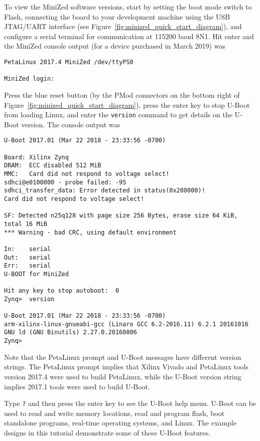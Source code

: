 To view the MiniZed software versions, start by setting the boot mode switch
to Flash, connecting the board to your development machine using the USB
JTAG/UART interface (see Figure~\ref{fig:minized_quick_start_diagram}), and
configure a serial terminal for communication at 115200 baud 8N1.
Hit enter and the MiniZed console output (for a device purchased in March 2019) was
%
\begin{verbatim}
PetaLinux 2017.4 MiniZed /dev/ttyPS0

MiniZed login:
\end{verbatim}
%
Press the blue reset button (by the PMod connectors on the bottom right
of Figure~\ref{fig:minized_quick_start_diagram}), press the enter key to
stop U-Boot from loading Linux, and enter the \verb+version+ command to
get details on the U-Boot version. The console output was
%
\begin{verbatim}
U-Boot 2017.01 (Mar 22 2018 - 23:33:56 -0700)

Board: Xilinx Zynq
DRAM:  ECC disabled 512 MiB
MMC:   Card did not respond to voltage select!
sdhci@e0100000 - probe failed: -95
sdhci_transfer_data: Error detected in status(0x208000)!
Card did not respond to voltage select!

SF: Detected n25q128 with page size 256 Bytes, erase size 64 KiB, total 16 MiB
*** Warning - bad CRC, using default environment

In:    serial
Out:   serial
Err:   serial
U-BOOT for MiniZed

Hit any key to stop autoboot:  0
Zynq>  version

U-Boot 2017.01 (Mar 22 2018 - 23:33:56 -0700)
arm-xilinx-linux-gnueabi-gcc (Linaro GCC 6.2-2016.11) 6.2.1 20161016
GNU ld (GNU Binutils) 2.27.0.20160806
Zynq>
\end{verbatim}
%
Note that the PetaLinux prompt and U-Boot messages have different version strings.
The PetaLinux prompt implies that Xilinx Vivado and PetaLinux tools version 2017.4
were used to build PetaLinux, while the U-Boot version string implies
2017.1 tools were used to build U-Boot.

Type \verb+?+ and then press the enter key to see the U-Boot help menu. U-Boot can be
used to read and write memory locations, read and program flash, boot standalone
programs, real-time operating systems, and Linux. The example designs in this tutorial
demonstrate some of these U-Boot features.

